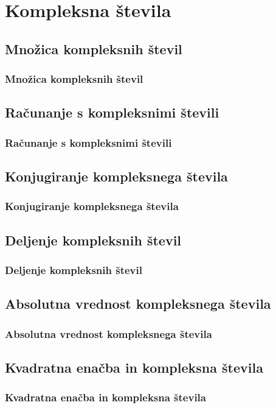 \section{Kompleksna števila}

\begin{frame}
    \sectionpage
\end{frame}

\begin{frame}
\end{frame}

    \subsection{Množica kompleksnih števil}

        \begin{frame}
            \frametitle{Množica kompleksnih števil}
        \end{frame}

    \subsection{Računanje s kompleksnimi števili}

        \begin{frame}
            \frametitle{Računanje s kompleksnimi števili}
        \end{frame}

    \subsection{Konjugiranje kompleksnega števila}

        \begin{frame}
            \frametitle{Konjugiranje kompleksnega števila}
        \end{frame}

    \subsection{Deljenje kompleksnih števil}

        \begin{frame}
            \frametitle{Deljenje kompleksnih števil}
        \end{frame}

    \subsection{Absolutna vrednost kompleksnega števila}

        \begin{frame}
            \frametitle{Absolutna vrednost kompleksnega števila}
        \end{frame}

    \subsection{Kvadratna enačba in kompleksna števila}

        \begin{frame}
            \frametitle{Kvadratna enačba in kompleksna števila}
        \end{frame}

